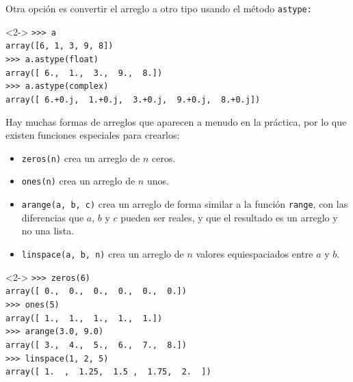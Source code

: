 \begin{frame}[fragile]
Otra opción es convertir el arreglo a otro tipo usando el método \texttt{astype:}
\begin{exampleblock}{}<2->
\verb|>>> a| \\
\pause
\verb|array([6, 1, 3, 9, 8])| \\
\pause
\verb|>>> a.astype(float)| \\
\pause
\verb|array([ 6.,  1.,  3.,  9.,  8.])| \\
\pause
\verb|>>> a.astype(complex)| \\
\pause
\verb|array([ 6.+0.j,  1.+0.j,  3.+0.j,  9.+0.j,  8.+0.j])|
\end{exampleblock}
\end{frame}
\begin{frame}[fragile]
Hay muchas formas de arreglos que aparecen a menudo en la práctica, por lo que existen funciones especiales para crearlos:
\begin{itemize}[<+->]
\item \texttt{zeros(n)} crea un arreglo de $n$ ceros.
\item \texttt{ones(n)} crea un arreglo de $n$ unos.
\item \texttt{arange(a, b, c)} crea un arreglo de forma similar a la función \texttt{range}, con las diferencias que $a$, $b$ y $c$ pueden ser reales, y que el resultado es un arreglo y no una lista.
\item \texttt{linspace(a, b, n)} crea un arreglo de $n$ valores equiespaciados entre $a$ y $b$.
\end{itemize}
\end{frame}
\begin{frame}[fragile]
\begin{exampleblock}{}<2->
\verb|>>> zeros(6)| \\
\pause
\verb|array([ 0.,  0.,  0.,  0.,  0.,  0.])| \\
\pause
\verb|>>> ones(5)| \\
\pause
\verb|array([ 1.,  1.,  1.,  1.,  1.])| \\
\pause
\verb|>>> arange(3.0, 9.0)| \\
\pause
\verb|array([ 3.,  4.,  5.,  6.,  7.,  8.])|\\
\pause
\verb|>>> linspace(1, 2, 5)| \\
\pause
\verb|array([ 1.  ,  1.25,  1.5 ,  1.75,  2.  ])|
\end{exampleblock}
\end{frame}
